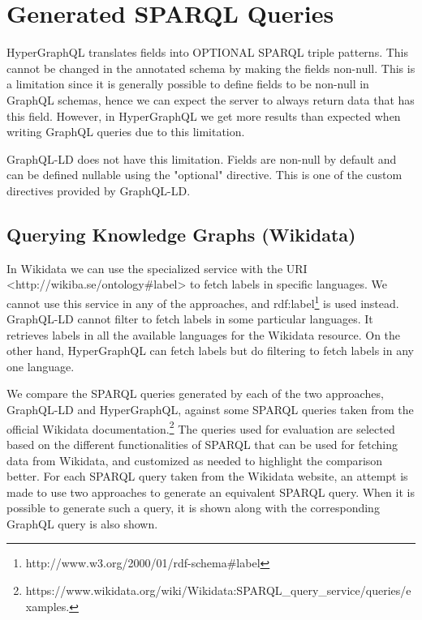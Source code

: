 \section{Generated SPARQL Queries}
HyperGraphQL translates fields into OPTIONAL SPARQL triple patterns. This cannot be changed in the annotated schema by making the fields non-null. This is a limitation since it is generally possible to define fields to be non-null in GraphQL schemas, hence we can expect the server to always return data that has this field. However, in HyperGraphQL we get more results than expected when writing GraphQL queries due to this limitation. 

GraphQL-LD does not have this limitation. Fields are non-null by default and can be defined nullable using the "optional" directive. This is one of the custom directives provided by GraphQL-LD.


\subsection{Querying Knowledge Graphs (Wikidata)}

In Wikidata we can use the specialized service with the URI <http://wikiba.se/ontology\#label> to fetch labels in specific languages. We cannot use this service in any of the approaches, and rdf:label\footnote{http://www.w3.org/2000/01/rdf-schema\#label} is used instead. GraphQL-LD cannot filter to fetch labels in some particular languages. It retrieves labels in all the available languages for the Wikidata resource. On the other hand, HyperGraphQL can fetch labels but do filtering to fetch labels in any one language. 

We compare the SPARQL queries generated by each of the two approaches, GraphQL-LD and HyperGraphQL, against some SPARQL queries taken from the official Wikidata documentation.\footnote{https://www.wikidata.org/wiki/Wikidata:SPARQL\_query\_service/queries/examples.} The queries used for evaluation are selected based on the different functionalities of SPARQL that can be used for fetching data from Wikidata, and customized as needed to highlight the comparison better. For each SPARQL query taken from the Wikidata website, an attempt is made to use two approaches to generate an equivalent SPARQL query. When it is possible to generate such a query, it is shown along with the corresponding GraphQL query is also shown.

